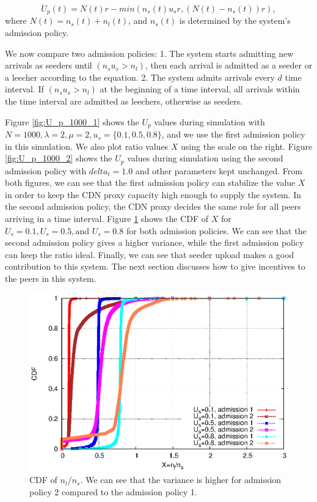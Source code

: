 \documentclass[paper]{ieice}
\begin{document}
\begin{equation}
        U_p(t) = N(t)r - min(n_s(t) u_s r, (N(t) - n_s(t))r),
\end{equation}
where $N(t) = n_s(t) + n_l(t)$, and $n_s(t)$ is determined by the system's admission policy.

We now compare two admission policies:
1. The system starts admitting new arrivals as seeders until $(n_su_s > n_l)$, then each arrival is admitted as a seeder or a leecher according to the equation.     
2. The system admits arrivals every $d$ time interval. If $(n_su_s > n_l)$ at the beginning of a time interval, all arrivals within the time interval are admitted as leechers, otherwise as seeders.

Figure \ref{fig:U_p_1000_1} shows the $U_p$ values during simulation with $N=1000, \lambda=2, \mu=2, u_s=\{0.1, 0.5, 0.8\}$, and we use the first admission policy in this simulation.  
We also plot ratio values $X$ using the scale on the right.  Figure \ref{fig:U_p_1000_2} shows the $U_p$ values during simulation using the second admission policy with $delta_t=1.0$ and other parameters kept unchanged.  
From both figures, we can see that the first admission policy can stabilize the value $X$ in order to keep the CDN proxy capacity high enough to supply the system.  
In the second admission policy, the CDN proxy decides the same role for all peers arriving in a time interval.
Figure \ref{fig:cdf} shows the CDF of $X$ for $U_s=0.1, U_s=0.5, \text{and } U_s=0.8$ for both admission policies.  
We can see that the second admission policy gives a higher variance, while the first admission policy can keep the ratio ideal.  
Finally, we can see that seeder upload makes a good contribution to this system.  
The next section discusses how to give incentives to the peers in this system.

\begin{figure}[hb] 
\begin{center}
\includegraphics[scale=0.65]{graphs/cdf.eps}
\end{center}
\caption{CDF of $n_l/n_s$. We can see that the variance is higher for admission policy 2 compared to the admission policy 1.}
\label{fig:cdf}
\vspace{-2mm}
\end{figure}
 
\end{document}
